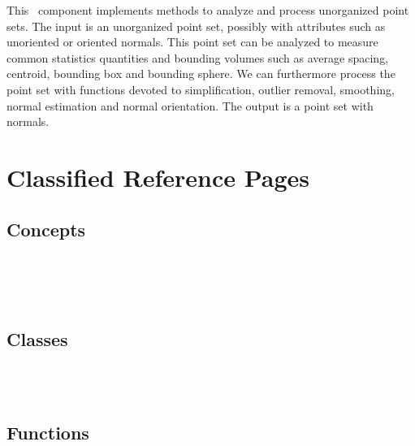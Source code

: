 


This \cgal\ component implements methods to analyze and process unorganized point sets.
The input is an unorganized point set, possibly with attributes such as unoriented or oriented normals.
This point set can be analyzed to measure common statistics quantities and bounding volumes such as average spacing, centroid, bounding box and bounding sphere.
We can furthermore process the point set with functions devoted to simplification, outlier removal, smoothing, normal estimation and normal orientation.
The output is a point set with normals.


\section{Classified Reference Pages}


\subsection{Concepts}

 \\
 \\
 \\


\subsection{Classes}

 \\
 \\


\subsection{Functions}

